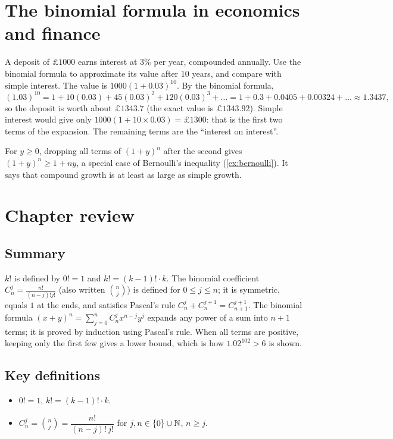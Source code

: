 \section{The binomial formula in economics and finance}\label{sec:binom-econ}

\begin{example}
A deposit of $\pounds1000$ earns interest at $3\%$ per year, compounded annually. Use the binomial formula to approximate
its value after $10$ years, and compare with simple interest.
\solution
The value is $1000(1+0.03)^{10}$. By the binomial formula,
\[
(1.03)^{10}=1+10(0.03)+45(0.03)^2+120(0.03)^3+\dots=1+0.3+0.0405+0.00324+\dots\approx1.3437,
\]
so the deposit is worth about $\pounds1343.7$ (the exact value is $\pounds1343.92$). Simple interest would give only
$1000(1+10\times0.03)=\pounds1300$: that is the first two terms of the expansion. The remaining terms are the ``interest
on interest''.
\end{example}

\begin{external}
For $y\ge0$, dropping all terms of $(1+y)^n$ after the second gives $(1+y)^n\ge1+ny$, a special case of Bernoulli's
inequality (\cref{ex:bernoulli}). It says that compound growth is at least as large as simple growth.
\end{external}

\section{Chapter review}
\subsection*{Summary}
$k!$ is defined by $0!=1$ and $k!=(k-1)!\cdot k$. The binomial coefficient $C_n^j=\frac{n!}{(n-j)!j!}$ (also written
$\binom nj$) is defined for $0\le j\le n$; it is symmetric, equals $1$ at the ends, and satisfies Pascal's rule
$C_n^j+C_n^{j+1}=C_{n+1}^{j+1}$. The binomial formula $(x+y)^n=\sum_{j=0}^nC_n^jx^{n-j}y^j$ expands any power of a sum
into $n+1$ terms; it is proved by induction using Pascal's rule. When all terms are positive, keeping only the first few
gives a lower bound, which is how $1.02^{102}>6$ is shown.

\subsection*{Key definitions}
\begin{itemize}
  \item $0!=1$, $k!=(k-1)!\cdot k$.
  \item $C_n^j=\binom nj=\dfrac{n!}{(n-j)!\,j!}$ for $j,n\in\{0\}\cup\mathbb{N}$, $n\ge j$.
\end{itemize}

